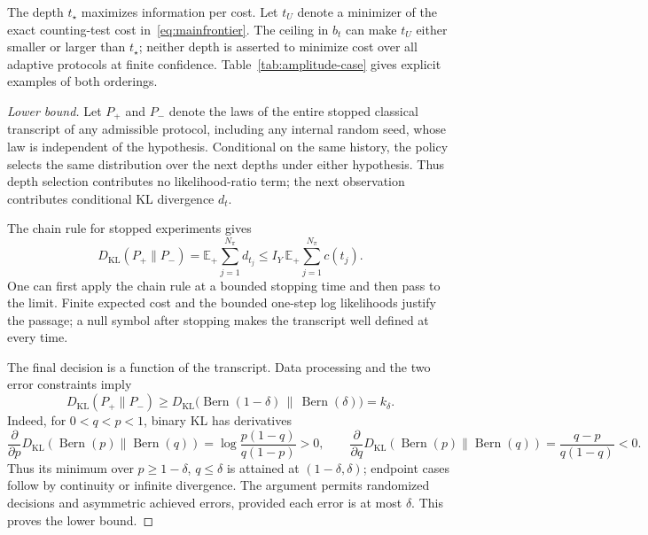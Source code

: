 \documentclass[11pt,a4paper]{article}
\newcommand{\E}{\mathbb E}
\theoremstyle{definition}
\theoremstyle{remark}
\numberwithin{equation}{section}
\begin{document}
The depth $t_\star$ maximizes information per cost. Let $t_U$ denote a
minimizer of the exact counting-test cost in~\eqref{eq:mainfrontier}.
The ceiling in $b_t$ can make $t_U$ either smaller or larger than
$t_\star$; neither depth is asserted to minimize cost over all adaptive
protocols at finite confidence. Table~\ref{tab:amplitude-case} gives
explicit examples of both orderings.

\begin{proof}[Lower bound]
Let $P_+$ and $P_-$ denote the laws of the entire stopped classical
transcript of any admissible protocol, including any internal random
seed, whose law is independent of the hypothesis. Conditional on the same history,
the policy selects the same distribution over the next depths under either
hypothesis. Thus depth selection contributes no likelihood-ratio term;
the next observation contributes conditional KL divergence $d_t$.

The chain rule for stopped experiments gives
\begin{equation}
 D_{\mathrm{KL}}(P_+\|P_-)
 =\E_+\sum_{j=1}^{N_\pi}d_{t_j}
 \leq I_Y\,\E_+\sum_{j=1}^{N_\pi}c(t_j).
\end{equation}
One can first apply the chain rule at a bounded stopping time and then pass
to the limit. Finite expected cost and the bounded one-step log likelihoods
justify the passage; a null symbol after stopping makes the transcript
well defined at every time.

The final decision is a function of the transcript. Data processing and
the two error constraints imply
\begin{equation}
 D_{\mathrm{KL}}(P_+\|P_-)
 \geq D_{\mathrm{KL}}\bigl(\operatorname{Bern}(1-\delta)
 \,\|\,\operatorname{Bern}(\delta)\bigr)=k_\delta.
\end{equation}
Indeed, for $0<q<p<1$, binary KL has derivatives
\[
 \frac{\partial}{\partial p}D_{\mathrm{KL}}(\operatorname{Bern}(p)\|
 \operatorname{Bern}(q))
 =\log\frac{p(1-q)}{q(1-p)}>0,\qquad
 \frac{\partial}{\partial q}D_{\mathrm{KL}}(\operatorname{Bern}(p)\|
 \operatorname{Bern}(q))=\frac{q-p}{q(1-q)}<0.
\]
Thus its minimum over $p\geq1-\delta$, $q\leq\delta$ is attained at
$(1-\delta,\delta)$; endpoint cases follow by continuity or infinite
divergence. The argument permits randomized decisions and asymmetric
achieved errors, provided each error is at most $\delta$.
This proves the lower bound.
\end{proof}
\end{document}

